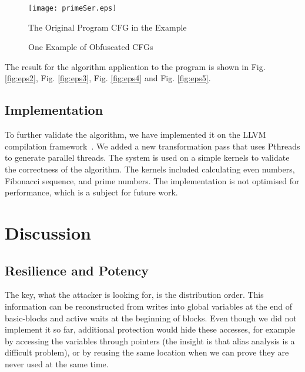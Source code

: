 \documentclass[3p,times,procedia,twocolumn,letterpaper]{elsarticle}
\begin{document}
\begin{figure}[]
\centering
\texttt{[image: primeSer.eps]}
\caption{The Original Program CFG in the Example}
\label{fig:eps1}
\end{figure}

\begin{figure}[]
\centering
{}
\centering
{}




\centering
{}

\centering
{}
\caption{One Example of Obfuscated CFGs}
\end{figure}


The result for the algorithm application to the program is shown in Fig. \ref{fig:eps2}, Fig. \ref{fig:eps3}, Fig. \ref{fig:eps4} and Fig. \ref{fig:eps5}. 

\subsection{Implementation}
To further validate the algorithm, we have implemented it on the LLVM compilation framework~\cite{llvm}. We added a new transformation pass that uses Pthreads to generate parallel threads. The system is used on a simple kernels to validate the correctness of the algorithm. The kernels included calculating even numbers, Fibonacci sequence, and prime numbers. The implementation is not optimised for performance, which is a subject for future work.

\section{Discussion}
\label{discussion}

\subsection{Resilience and Potency}
The key, what the attacker is looking for, is the distribution
order. This information can be reconstructed from writes into global
variables at the end of basic-blocks and active waits at the beginning
of blocks. Even though we did not implement it so far, additional
protection would hide these accesses, for example by accessing the
variables through pointers (the insight is that alias analysis is a
difficult problem), or by reusing the same location when we can prove
they are never used at the same time.
\end{document}
